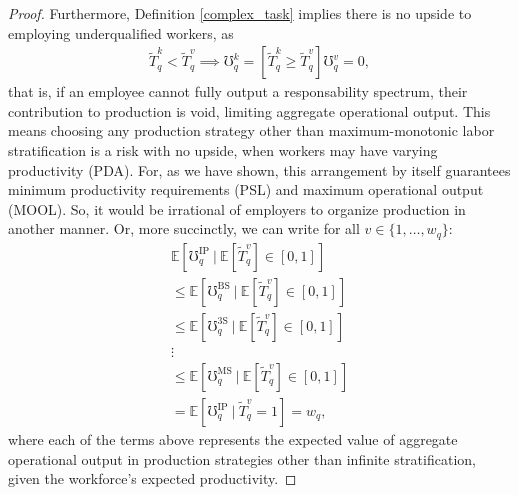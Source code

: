 \documentclass[hidelinks, nonatbib]{elsarticle}
\begin{document}
\begin{lemma}
\begin{proof}
        Furthermore, Definition \ref{complex_task} implies there is no upside to employing underqualified workers, as 
        \begin{gather}
            \tilde{T}_{q}^{k}
            <
            \tilde{T}_{q}^{v}
            \implies
            \mho_{q}^{k}
            =
            \left[
                \tilde{T}_{q}^{k}
                \geq
                \tilde{T}_{q}^{v}
            \right]
            \mho_{q}^{v}
            =
            0
            ,
        \end{gather}
        that is, if an employee cannot fully output a responsability spectrum, their contribution to production is void, limiting aggregate operational output. This means choosing any production strategy other than maximum-monotonic labor stratification is a risk with no upside, when workers may have varying productivity (PDA). For, as we have shown, this arrangement by itself guarantees minimum productivity requirements (PSL) and maximum operational output (MOOL). So, it would be irrational of employers to organize production in another manner. Or, more succinctly, we can write for all $v \in \{1, \dots, w_q\}$:
        \begin{gather}
            \mathbb{E}[
                \mho_{q}^{\text{IP}}
                \
                |
                \
                \mathbb{E}[
                    \tilde{T}_{q}^{v}
                ]
                \in [0,1]
            ]
            \\
            \leq
            \mathbb{E}[
                \mho_{q}^{\text{BS}}
                \
                |
                \
                \mathbb{E}[
                    \tilde{T}_{q}^{v}
                ]
                \in [0,1]
            ]
            \\
            \leq
            \mathbb{E}[
                \mho_{q}^{\text{3S}}
                \
                |
                \
                \mathbb{E}[
                    \tilde{T}_{q}^{v}
                ]
                \in [0,1]
            ]
            \\
            \vdots
            \\
            \leq
            \mathbb{E}[
                \mho_{q}^{\text{MS}}
                \
                |
                \
                \mathbb{E}[
                    \tilde{T}_{q}^{v}
                ]
                \in [0,1]
            ]
            \\
            =
            \mathbb{E}[
                \mho_{q}^{\text{IP}}
                \
                |
                \
                \tilde{T}_{q}^{v}
                = 1
            ]
            =
            w_q
            ,
        \end{gather}
        where each of the terms above represents the expected value of aggregate operational output in production strategies other than infinite stratification, given the workforce's expected productivity.


\end{proof}
\end{lemma}
\end{document}
